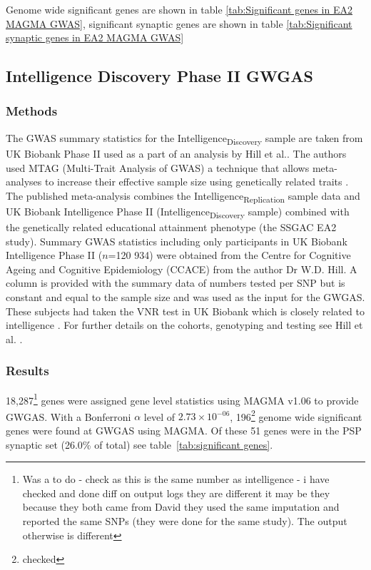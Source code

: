 Genome wide significant genes  are shown in table \ref{tab:Significant genes in EA2 MAGMA GWAS}, significant synaptic genes are shown in table \ref{tab:Significant synaptic genes in EA2  MAGMA GWAS}







\subsection{Intelligence Discovery Phase II GWGAS}

\subsubsection{Methods}
The GWAS summary statistics for the Intelligence\textsubscript{Discovery} sample are taken from UK Biobank Phase II used as a part of an analysis by Hill et al.\cite{hill2019combined}. The authors used MTAG (Multi-Trait Analysis of GWAS) a technique that allows meta-analyses to increase their effective sample size using genetically related traits \cite{turley2018multi}. The published meta-analysis\cite{hill2019combined} combines the Intelligence\textsubscript{Replication} sample data \cite{sniekers2017genome} and UK Biobank Intelligence Phase II (Intelligence\textsubscript{Discovery} sample) combined with the genetically related educational attainment phenotype (the SSGAC EA2 study)\cite{okbay2016genome}. Summary GWAS statistics including only participants in UK Biobank Intelligence Phase II ($n$=120 934) were obtained from the Centre for Cognitive Ageing and Cognitive Epidemiology (CCACE) from the author Dr W.D. Hill.  A column is provided with the summary data of numbers tested per SNP but is constant and equal to the sample size and was used as the input for the GWGAS.      These subjects had taken the VNR test in UK Biobank which is closely related to intelligence \cite{hill2019combined}. For further details on the cohorts, genotyping and testing see Hill et al. \cite{hill2019combined}.


\subsubsection{Results}
18,287\footnote{ Was a to do - check as this is the same number as intelligence - i have checked and done diff on output logs they are different it may be they because they both came from David they used the same imputation and reported the same SNPs (they were done for the same study). The output otherwise is different} genes were assigned gene level statistics using MAGMA v1.06 to provide GWGAS.  With a Bonferroni $\alpha$ level of  $
2.73\times 10^{-06}$, 196\footnote{checked} genome wide significant genes were found at GWGAS using MAGMA. Of these 51 genes were in the PSP synaptic set (26.0\% of total) see table~\ref{tab:significant genes}.

